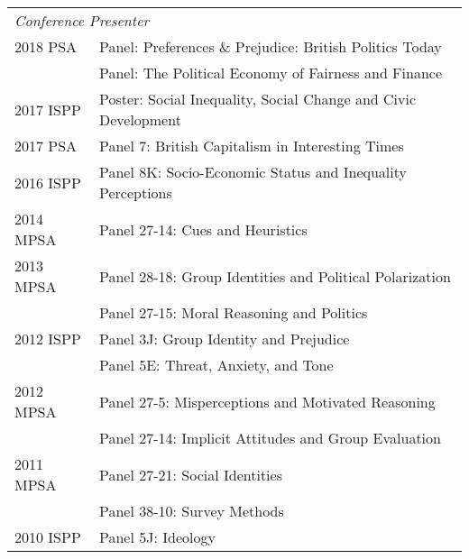 \documentclass[12pt]{article}
\begin{document}
\begin{longtable}{@{}p{3.5cm}@{}l}%
    \multicolumn{2}{l}{\textit{Conference Presenter}}\\   
    		
    		2018 PSA & {Panel: Preferences \& Prejudice: British Politics Today}\\            
			 & {Panel: The Political Economy of Fairness and Finance}\\            

            2017 ISPP & {Poster: Social Inequality, Social Change and Civic Development}\\       
    
			2017 PSA & {Panel 7: British Capitalism in Interesting Times}\\            
            
            2016 ISPP & {Panel 8K: Socio-Economic Status and Inequality Perceptions}\\           
            
            2014 MPSA & {Panel 27-14: Cues and 
            Heuristics}\\            
            
            2013 MPSA & {Panel 28-18: Group Identities 
            and Political Polarization}\\
            
            & {Panel 27-15: Moral Reasoning and Politics}\\
            
            2012 ISPP & {Panel 3J: Group Identity and Prejudice}\\
            
            & {Panel 5E: Threat, Anxiety, and Tone}\\
            
            2012 MPSA & {Panel 27-5: Misperceptions 
            and Motivated Reasoning}\\
            
            & {Panel 27-14: Implicit Attitudes and Group Evaluation}\\
            
            2011 MPSA & {Panel 27-21: Social Identities}\\
            
            & {Panel 38-10: Survey Methods}\\
            
            2010 ISPP & {Panel 5J: Ideology}\\
            

\end{longtable}
\end{document}
